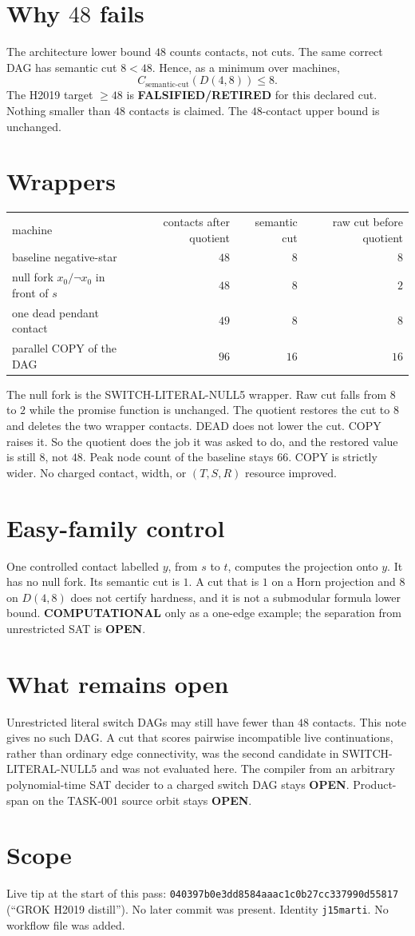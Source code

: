 \documentclass[11pt]{article}
\begin{document}
\section*{Why $48$ fails}
The architecture lower bound $48$ counts contacts, not cuts.
The same correct DAG has semantic cut $8<48$.
Hence, as a minimum over machines,
\[
C_{\mathrm{semantic\textrm{-}cut}}(D(4,8))\le 8.
\]
The H2019 target $\ge 48$ is \textbf{FALSIFIED/RETIRED} for this declared cut.
Nothing smaller than $48$ contacts is claimed.
The $48$-contact upper bound is unchanged.

\section*{Wrappers}
\begin{center}
\begin{tabular}{lrrr}
machine & contacts after quotient & semantic cut & raw cut before quotient \\
baseline negative-star & $48$ & $8$ & $8$ \\
null fork $x_0/\neg x_0$ in front of $s$ & $48$ & $8$ & $2$ \\
one dead pendant contact & $49$ & $8$ & $8$ \\
parallel COPY of the DAG & $96$ & $16$ & $16$ \\
\end{tabular}
\end{center}
The null fork is the SWITCH-LITERAL-NULL5 wrapper.
Raw cut falls from $8$ to $2$ while the promise function is unchanged.
The quotient restores the cut to $8$ and deletes the two wrapper contacts.
DEAD does not lower the cut.
COPY raises it.
So the quotient does the job it was asked to do, and the restored value is still $8$, not $48$.
Peak node count of the baseline stays $66$.
COPY is strictly wider.
No charged contact, width, or $(T,S,R)$ resource improved.

\section*{Easy-family control}
One controlled contact labelled $y$, from $s$ to $t$, computes the projection onto $y$.
It has no null fork.
Its semantic cut is $1$.
A cut that is $1$ on a Horn projection and $8$ on $D(4,8)$ does not certify hardness,
and it is not a submodular formula lower bound.
\textbf{COMPUTATIONAL} only as a one-edge example; the separation from unrestricted SAT is \textbf{OPEN}.

\section*{What remains open}
Unrestricted literal switch DAGs may still have fewer than $48$ contacts.
This note gives no such DAG.
A cut that scores pairwise incompatible live continuations, rather than ordinary
edge connectivity, was the second candidate in SWITCH-LITERAL-NULL5 and was not evaluated here.
The compiler from an arbitrary polynomial-time SAT decider to a charged switch DAG stays \textbf{OPEN}.
Product-span on the TASK-001 source orbit stays \textbf{OPEN}.

\section*{Scope}
Live tip at the start of this pass:
\texttt{040397b0e3dd8584aaac1c0b27cc337990d55817}
(``GROK H2019 distill'').
No later commit was present.
Identity \texttt{j15marti}.
No workflow file was added.
\end{document}

